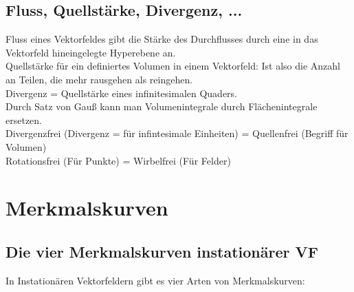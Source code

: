 \documentclass{article}
\begin{document}
\subsection{Fluss, Quellstärke, Divergenz, ...}

Fluss eines Vektorfeldes gibt die Stärke des Durchflusses durch eine in das Vektorfeld hineingelegte Hyperebene an.\\

\noindent Quellstärke für ein definiertes Volumen in einem Vektorfeld: Ist also die Anzahl an Teilen, die mehr rausgehen als reingehen.\\

\noindent Divergenz	= Quellstärke eines infinitesimalen Quaders.\\

\noindent Durch Satz von Gauß kann man Volumenintegrale durch Flächenintegrale ersetzen.\\

\noindent Divergenzfrei (Divergenz = für infintesimale Einheiten) = Quellenfrei (Begriff für Volumen)\\
\noindent Rotationsfrei (Für Punkte) = Wirbelfrei (Für Felder) \\




\pagebreak
\section{Merkmalskurven}
\subsection{Die vier Merkmalskurven instationärer VF}
In Instationären Vektorfeldern gibt es vier Arten von Merkmalskurven:
\end{document}
